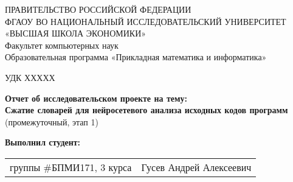 \begin{titlepage}
\newpage

{
\begin{center}
ПРАВИТЕЛЬСТВО РОССИЙСКОЙ ФЕДЕРАЦИИ\\
ФГАОУ ВО НАЦИОНАЛЬНЫЙ ИССЛЕДОВАТЕЛЬСКИЙ УНИВЕРСИТЕТ\\
«ВЫСШАЯ ШКОЛА ЭКОНОМИКИ»
\\
\bigskip
Факультет компьютерных наук\\
Образовательная программа «Прикладная математика и информатика»
\end{center}
}

\vspace{2em}
УДК ХХХХХ %
\vspace{4em}

\begin{center}
{\bf Отчет об исследовательском проекте на тему:}\\
{\bf Сжатие словарей для нейросетевого анализа исходных кодов программ}\\
(промежуточный, этап 1)
\end{center}

\vspace{2em}

{\bf Выполнил студент: \vspace{2mm}}

{
\begin{tabular}{l@{\hskip 1.5cm}l}
группы \#БПМИ171, 3 курса & Гусев Андрей Алексеевич \\
\end{tabular}}



\end{titlepage}
